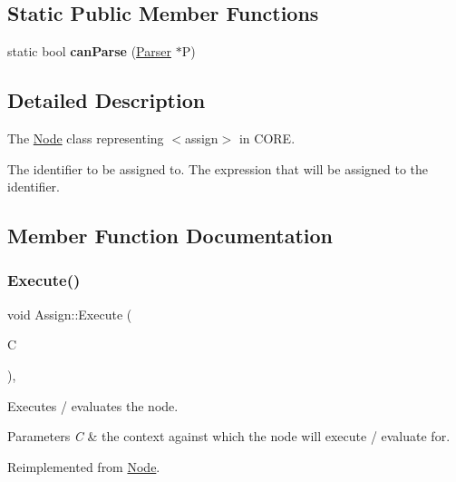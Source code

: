 \subsection*{Static Public Member Functions}
\begin{DoxyCompactItemize}
\item 
\mbox{\label{class_assign_a2c82e269380be77374c508e9c835019a}} 
static bool {\bfseries can\+Parse} (\mbox{\hyperlink{class_parser}{Parser}} $\ast$P)
\end{DoxyCompactItemize}


\subsection{Detailed Description}
The \mbox{\hyperlink{class_node}{Node}} class representing {\ttfamily $<$assign$>$} in C\+O\+RE. 

The identifier to be assigned to. The expression that will be assigned to the identifier. 

\subsection{Member Function Documentation}
\mbox{\label{class_assign_a1803b147539aa47e431adc87c171a252}} 
\subsubsection{\texorpdfstring{Execute()}{Execute()}}
{\footnotesize\ttfamily void Assign\+::\+Execute (\begin{DoxyParamCaption}\item[{\mbox{\hyperlink{class_a_s_t_context}{A\+S\+T\+Context}} \&}]{C }\end{DoxyParamCaption})\hspace{0.3cm}{\ttfamily [override]}, {\ttfamily [virtual]}}

Executes / evaluates the node. 
\begin{DoxyParams}{Parameters}
{\em C} & the context against which the node will execute / evaluate for. \\
\hline
\end{DoxyParams}


Reimplemented from \mbox{\hyperlink{class_node_a27ad1ba81d2596817b361368282bcbfa}{Node}}.

